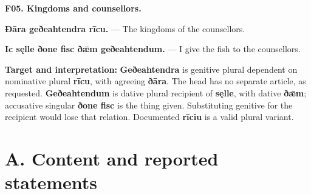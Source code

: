 \par\begin{minipage}{\linewidth}\raggedright
\textbf{F05. Kingdoms and counsellors.}

\textbf{Ðāra geðeahtendra rīcu.} — The kingdoms of the counsellors.

\textbf{Ic sęlle ðone fisc ðǣm geðeahtendum.} — I give the fish to the counsellors.

\textbf{Target and interpretation:} \textbf{Geðeahtendra} is genitive plural dependent on nominative plural \textbf{rīcu}, with agreeing \textbf{ðāra}. The head has no separate article, as requested. \textbf{Geðeahtendum} is dative plural recipient of \textbf{sęlle}, with dative \textbf{ðǣm}; accusative singular \textbf{ðone fisc} is the thing given. Substituting genitive for the recipient would lose that relation. Documented \textbf{rīciu} is a valid plural variant.

\end{minipage}\par\addvspace{4pt}

\section*{A. Content and reported statements}

